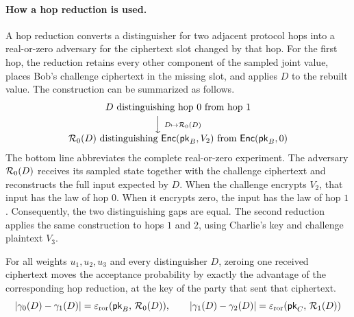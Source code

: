 \paragraph{How a hop reduction is used.}
A hop reduction converts a distinguisher for two adjacent protocol hops into
a real-or-zero adversary for the ciphertext slot changed by that hop. For the
first hop, the reduction retains every other component of the sampled joint
value, places Bob's challenge ciphertext in the missing slot, and applies
$D$ to the rebuilt value. The construction can be summarized as follows.
\[
\begin{array}{c}
D \text{ distinguishing hop $0$ from hop $1$}
\\[0.6ex]
\Big\downarrow\ {\scriptstyle D \mapsto \mathcal{R}_{0}(D)}
\\[0.6ex]
\mathcal{R}_{0}(D) \text{ distinguishing }
\mathsf{Enc}(\mathsf{pk}_B,V_2) \text{ from } \mathsf{Enc}(\mathsf{pk}_B,0)
\end{array}
\]
The bottom line abbreviates the complete real-or-zero experiment. The
adversary $\mathcal{R}_{0}(D)$ receives its sampled state together with the
challenge ciphertext and reconstructs the full input expected by $D$. When
the challenge encrypts $V_2$, that input has the law of hop $0$. When it
encrypts zero, the input has the law of hop $1$. Consequently, the two
distinguishing gaps are equal. The second reduction applies the same
construction to hops $1$ and $2$, using Charlie's key and challenge plaintext
$V_3$.

\begin{lemma}
  \label{lem:alice_view_advantage}
  \rocqok
  For all weights $u_1, u_2, u_3$ and every distinguisher $D$, zeroing one
  received ciphertext moves the acceptance probability by exactly the advantage
  of the corresponding hop reduction, at the key of the party that sent that
  ciphertext.
  \[ \lvert \gamma_0(D) - \gamma_1(D)\rvert = \varepsilon_{\mathrm{ror}}(\mathsf{pk}_B,\,\mathcal{R}_{0}(D)),
     \qquad
     \lvert \gamma_1(D) - \gamma_2(D)\rvert = \varepsilon_{\mathrm{ror}}(\mathsf{pk}_C,\,\mathcal{R}_{1}(D)) \]
\end{lemma}

